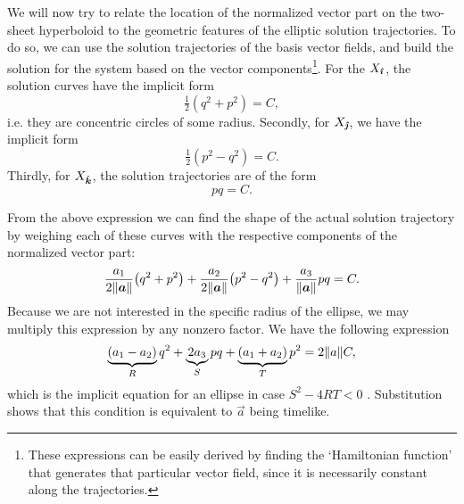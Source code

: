 We will now try to relate the location of the normalized vector part on the two-sheet hyperboloid to the geometric features of the elliptic solution trajectories. To do so, we can use the solution trajectories of the basis vector fields, and build the solution for the system based on the vector components\footnote{These expressions can be easily derived by finding the `Hamiltonian function' that generates that particular vector field, since it is necessarily constant along the trajectories.}. For the \(X_\quati\), the solution curves have the implicit form 
\begin{equation}
     \tfrac{1}{2}(q^2 + p^2) = C,
\end{equation}
i.e. they are concentric circles of some radius. Secondly, for \(X_\quatj\), we have the implicit form
\begin{equation}
     \tfrac{1}{2}(p^2 - q^2) = C.
\end{equation}
Thirdly, for \(X_\quatk\), the solution trajectories are of the form
\begin{equation}
     pq = C.
\end{equation}

From the above expression we can find the shape of the actual solution trajectory by weighing each of these curves with the respective components of the normalized vector part:
\begin{equation}
     \frac{a_1}{2\norm{\vec{a}}}\qty(q^2 + p^2)  + \frac{a_2}{2\norm{\vec{a}}}\qty(p^2 - q^2) + \frac{a_3}{\norm{\vec{a}}}pq = C.
\end{equation}
Because we are not interested in the specific radius of the ellipse, we may multiply this expression by any nonzero factor. We have the following expression 
\begin{equation}
    \underbrace{(a_1 - a_2)}_{R} q^2 + \underbrace{2 a_3}_{S} pq + \underbrace{(a_1 + a_2)}_{T} p^2 = 2\norm{a}C,
    \label{eq:ellipse_equation}
\end{equation}
which is the implicit equation for an ellipse in case \(S^2 - 4RT < 0\) \cite{Rapp1991}. Substitution shows that this condition is equivalent to \(\vec{a}\) being timelike. 

